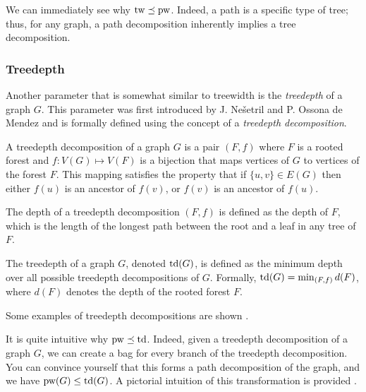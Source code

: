 \medskip

We can immediately see why $\text{tw} \preceq \text{pw}$. Indeed, a path is a specific type of tree; thus, for any graph, a path decomposition inherently implies a tree decomposition.

\subsubsection*{Treedepth}

Another parameter that is somewhat similar to treewidth is the \textit{treedepth} of a graph $G$. This parameter was first introduced by J. Nešetril and P. Ossona de Mendez \cite{nevsetvril2006tree} and is formally defined using the concept of a \textit{treedepth decomposition}.

\begin{definition}
    A treedepth decomposition of a graph $G$ is a pair $(F, f)$ where $F$ is a rooted forest and $f : V(G) \mapsto V(F)$ is a bijection that maps vertices of $G$ to vertices of the forest $F$. This mapping satisfies the property that if $\{u, v\} \in E(G)$ then either $f(u)$ is an ancestor of $f(v)$, or $f(v)$ is an ancestor of $f(u)$.
\end{definition}

\begin{definition}
    The depth of a treedepth decomposition $(F, f)$ is defined as the depth of $F$, which is the length of the longest path between the root and a leaf in any tree of $F$.
\end{definition}

\begin{definition}[treedepth]
    The treedepth of a graph $G$, denoted $\text{td}(G)$, is defined as the minimum depth over all possible treedepth decompositions of $G$. Formally, $\text{td}(G) = \min_{(F, f)} d(F)$, where $d(F)$ denotes the depth of the rooted forest $F$.
\end{definition}

Some examples of treedepth decompositions are shown .



\medskip

It is quite intuitive why $\text{pw} \preceq \text{td}$. Indeed, given a treedepth decomposition of a graph $G$, we can create a bag for every branch of the treedepth decomposition. You can convince yourself that this forms a path decomposition of the graph, and we have $\text{pw}(G) \leq \text{td}(G)$. A pictorial intuition of this transformation is provided .

